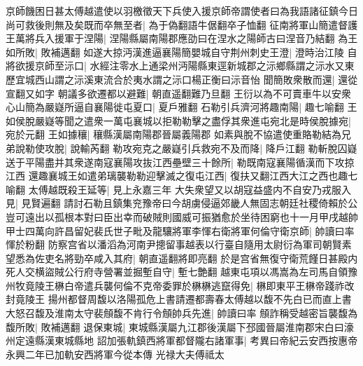 京師饑困日甚太傅越遣使以羽檄徵天下兵使入援京師帝謂使者曰為我語諸征鎮今日尚可救後則無及矣既而卒無至者|{
	為于偽翻語牛倨翻卒子恤翻}
征南將軍山簡遣督護王萬將兵入援軍于涅陽|{
	涅陽縣屬南陽郡應劭曰在涅水之陽師古曰涅音乃結翻}
為王如所敗|{
	敗補邁翻}
如遂大掠沔漢進逼襄陽簡嬰城自守荆州刺史王澄|{
	澄時治江陵}
自將欲援京師至沶口|{
	水經注零水上通梁州沔陽縣東逕新城郡之沶鄉縣謂之沶水又東歷宜城西山謂之沶溪東流合於夷水謂之沶口楊正衡曰沶音怡}
聞簡敗衆散而還|{
	還從宣翻又如字}
朝議多欲遷都以避難|{
	朝直遥翻難乃旦翻}
王衍以為不可賣車牛以安衆心山簡為嚴嶷所逼自襄陽徙屯夏口|{
	夏戶雅翻}
石勒引兵濟河將趣南陽|{
	趣七喻翻}
王如侯脫嚴嶷等聞之遣衆一萬屯襄城以拒勒勒擊之盡俘其衆進屯宛北是時侯脫據宛|{
	宛於元翻}
王如據穰|{
	穰縣漢屬南陽郡晉屬義陽郡}
如素與脫不協遣使重賂勒結為兄弟說勒使攻脫|{
	說輸芮翻}
勒攻宛克之嚴嶷引兵救宛不及而降|{
	降戶江翻}
勒斬脫囚嶷送于平陽盡并其衆遂南寇襄陽攻抜江西壘壁三十餘所|{
	勒既南寇襄陽循漢而下攻掠江西}
還趣襄城王如遣弟璃襲勒勒迎擊滅之復屯江西|{
	復扶又翻江西大江之西也趣七喻翻}
太傅越既殺王延等|{
	見上永嘉三年}
大失衆望又以胡寇益盛内不自安乃戎服入見|{
	見賢遍翻}
請討石勒且鎮集兖豫帝曰今胡虜侵逼郊畿人無固志朝廷社稷倚賴於公豈可遠出以孤根本對曰臣出幸而破賊則國威可振猶愈於坐待困窮也十一月甲戌越帥甲士四萬向許昌留妃裴氏世子毗及龍驤將軍李惲右衛將軍何倫守衛京師|{
	帥讀曰率惲於粉翻}
防察宫省以潘滔為河南尹摠留事越表以行臺自隨用太尉衍為軍司朝賢素望悉為佐吏名將勁卒咸入其府|{
	朝直遥翻將即亮翻}
於是宫省無復守衛荒饉日甚殿内死人交横盜賊公行府寺營署並掘塹自守|{
	塹七艶翻}
越東屯項以馮嵩為左司馬自領豫州牧竟陵王楙白帝遣兵襲何倫不克帝委罪於楙楙逃竄得免|{
	楙即東平王楙帝踐祚改封竟陵王}
揚州都督周馥以洛陽孤危上書請遷都壽春太傅越以馥不先白已而直上書大怒召馥及淮南太守裴頠馥不肯行令頠帥兵先進|{
	帥讀曰率}
頠詐稱受越密旨襲馥為馥所敗|{
	敗補邁翻}
退保東城|{
	東城縣漢屬九江郡後漢屬下邳國晉屬淮南郡宋白曰濠州定遠縣漢東城縣地}
詔加張軌鎮西將軍都督隴右諸軍事|{
	考異曰帝紀云安西按惠帝永興二年已加軌安西將軍今從本傳}
光禄大夫傅祗太

